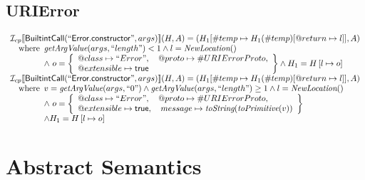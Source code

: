 \subsection{URIError}
\[
\begin{array}{l}
\mathcal{I} _{cp}\llbracket \mbox{\textsf{BuiltintCall}}(``\mbox{\textsf{Error.constructor}}",args)\rrbracket(H,A)
  = (H_1[\#temp \mapsto H_1(\#temp)[@return \mapsto l]], A)\\
\quad{\rm where}\begin{array}[t]{l}
  \emph{getArgValue}(args, ``length") < 1 
  \land l=\emph{NewLocation}()\\
  \land\ o = \left\{\begin{array}{l}
    @class\mapsto ``Error", \quad
    @proto\mapsto \#URIErrorProto,\\
    @extensible\mapsto \mbox{\textsf{true}}
    \end{array}\right\}
  \land H_1=H\left[l\mapsto o\right]\\
  \end{array}\\
  
\mathcal{I} _{cp}\llbracket \mbox{\textsf{BuiltintCall}}(``\mbox{\textsf{Error.constructor}}",args)\rrbracket(H,A)
  = (H_1[\#temp \mapsto H_1(\#temp)[@return \mapsto l]], A)\\
\quad{\rm where}\begin{array}[t]{l}
  v = \emph{getArgValue}(args, ``0") \land \emph{getArgValue}(args, ``length") \geq 1
  \land l=\emph{NewLocation}()\\
  \land\ o = \left\{\begin{array}{l}
    @class\mapsto ``Error", \quad
    @proto\mapsto \#URIErrorProto,\\
    @extensible\mapsto \mbox{\textsf{true}},  \quad
    message \mapsto \emph{toString}(\emph{toPrimitive}(v)) 
    \end{array}\right\}\\
  \land H_1=H\left[l\mapsto o\right]
  \end{array}\\

\end{array}
\]


\section{Abstract Semantics}

